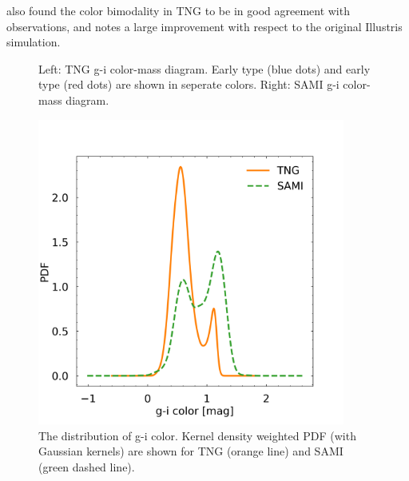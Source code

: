 \textcite{Nelson_2018} also found the color bimodality in TNG to be in good agreement with observations, and notes a large improvement with respect to the original Illustris simulation.

\begin{figure}
    \centering
    \caption{Left: TNG g-i color-mass diagram. Early type (blue dots) and early type (red dots) are shown in seperate colors. Right: SAMI g-i color-mass diagram.}
    \label{color_magnitude_res}
\end{figure}


\begin{figure}
    \centering
    \includegraphics[width=0.9\textwidth]{images/results_pdf_g_i_band.png}
    \caption{The distribution of g-i color. Kernel density weighted PDF (with Gaussian kernels) are shown for TNG (orange line) and SAMI (green dashed line).}
    \label{pdf_color}
\end{figure}

